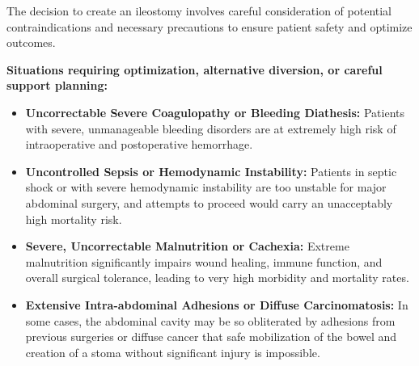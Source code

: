 The decision to create an ileostomy involves careful consideration of potential contraindications and necessary precautions to ensure patient safety and optimize outcomes.

\textbf{Situations requiring optimization, alternative diversion, or careful support planning:}
\begin{itemize}
  \item \textbf{Uncorrectable Severe Coagulopathy or Bleeding Diathesis:} Patients with severe, unmanageable bleeding disorders are at extremely high risk of intraoperative and postoperative hemorrhage.
  
  \item \textbf{Uncontrolled Sepsis or Hemodynamic Instability:} Patients in septic shock or with severe hemodynamic instability are too unstable for major abdominal surgery, and attempts to proceed would carry an unacceptably high mortality risk.
  
  \item \textbf{Severe, Uncorrectable Malnutrition or Cachexia:} Extreme malnutrition significantly impairs wound healing, immune function, and overall surgical tolerance, leading to very high morbidity and mortality rates.
  
  \item \textbf{Extensive Intra-abdominal Adhesions or Diffuse Carcinomatosis:} In some cases, the abdominal cavity may be so obliterated by adhesions from previous surgeries or diffuse cancer that safe mobilization of the bowel and creation of a stoma without significant injury is impossible.
\end{itemize}

